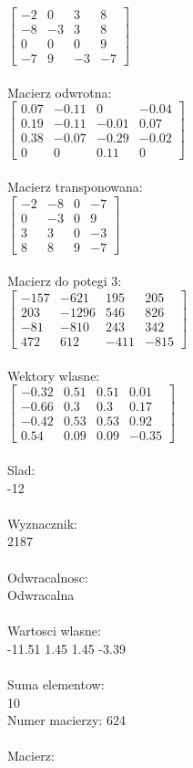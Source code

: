 \documentclass[a4paper,12pt]{article}
\begin{document}
$\begin{bmatrix} -2&0&3&8\\-8&-3&3&8\\0&0&0&9\\-7&9&-3&-7 \end{bmatrix}$
\\
\\
Macierz odwrotna:\\

$\begin{bmatrix} 0.07&-0.11&0&-0.04\\0.19&-0.11&-0.01&0.07\\0.38&-0.07&-0.29&-0.02\\0&0&0.11&0 \end{bmatrix}$
\\
\\
Macierz transponowana:\\

$\begin{bmatrix} -2&-8&0&-7\\0&-3&0&9\\3&3&0&-3\\8&8&9&-7 \end{bmatrix}$
\\
\\
Macierz do potegi 3:\\

$\begin{bmatrix} -157&-621&195&205\\203&-1296&546&826\\-81&-810&243&342\\472&612&-411&-815 \end{bmatrix}$
\\
\\
Wektory wlasne:\\

$\begin{bmatrix} -0.32&0.51&0.51&0.01\\-0.66&0.3&0.3&0.17\\-0.42&0.53&0.53&0.92\\0.54&0.09&0.09&-0.35 \end{bmatrix}$
\\
\\
Slad:\\
-12
\\
\\
Wyznacznik:\\
2187
\\
\\
Odwracalnosc:\\
Odwracalna
\\
\\
Wartosci wlasne:\\
-11.51 1.45 1.45 -3.39
\\
\\
Suma elementow:\\
10
\\
\newpage
Numer macierzy:
624
\\
\\
Macierz:\\
\end{document}
